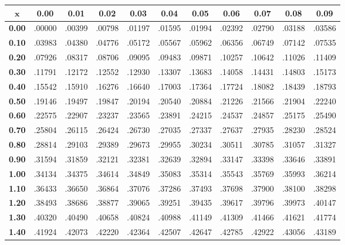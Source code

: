 \noindent \begin{tabular}{|c|c|c|c|c|c|c|c|c|c|c|}
\hline
$\pmb{x}$ & \textbf{ 0.00 } & \textbf{ 0.01 } & \textbf{ 0.02 } & \textbf{ 0.03 } & \textbf{ 0.04 } & \textbf{ 0.05 } & \textbf{ 0.06 } & \textbf{ 0.07 } & \textbf{ 0.08 } & \textbf{ 0.09 } \\ 
 \hline 
\textbf{ 0.00 } & .00000 & .00399 & .00798 & .01197 & .01595 & .01994 & .02392 & .02790 & .03188 & .03586\\ 
\hline
\textbf{ 0.10 } & .03983 & .04380 & .04776 & .05172 & .05567 & .05962 & .06356 & .06749 & .07142 & .07535\\ 
\hline
\textbf{ 0.20 } & .07926 & .08317 & .08706 & .09095 & .09483 & .09871 & .10257 & .10642 & .11026 & .11409\\ 
\hline
\textbf{ 0.30 } & .11791 & .12172 & .12552 & .12930 & .13307 & .13683 & .14058 & .14431 & .14803 & .15173\\ 
\hline
\textbf{ 0.40 } & .15542 & .15910 & .16276 & .16640 & .17003 & .17364 & .17724 & .18082 & .18439 & .18793\\ 
\hline
\textbf{ 0.50 } & .19146 & .19497 & .19847 & .20194 & .20540 & .20884 & .21226 & .21566 & .21904 & .22240\\ 
\hline
\textbf{ 0.60 } & .22575 & .22907 & .23237 & .23565 & .23891 & .24215 & .24537 & .24857 & .25175 & .25490\\ 
\hline
\textbf{ 0.70 } & .25804 & .26115 & .26424 & .26730 & .27035 & .27337 & .27637 & .27935 & .28230 & .28524\\ 
\hline
\textbf{ 0.80 } & .28814 & .29103 & .29389 & .29673 & .29955 & .30234 & .30511 & .30785 & .31057 & .31327\\ 
\hline
\textbf{ 0.90 } & .31594 & .31859 & .32121 & .32381 & .32639 & .32894 & .33147 & .33398 & .33646 & .33891\\ 
\hline
\textbf{ 1.00 } & .34134 & .34375 & .34614 & .34849 & .35083 & .35314 & .35543 & .35769 & .35993 & .36214\\ 
\hline
\textbf{ 1.10 } & .36433 & .36650 & .36864 & .37076 & .37286 & .37493 & .37698 & .37900 & .38100 & .38298\\ 
\hline
\textbf{ 1.20 } & .38493 & .38686 & .38877 & .39065 & .39251 & .39435 & .39617 & .39796 & .39973 & .40147\\ 
\hline
\textbf{ 1.30 } & .40320 & .40490 & .40658 & .40824 & .40988 & .41149 & .41309 & .41466 & .41621 & .41774\\ 
\hline
\textbf{ 1.40 } & .41924 & .42073 & .42220 & .42364 & .42507 & .42647 & .42785 & .42922 & .43056 & .43189\\ 

\end{tabular}
